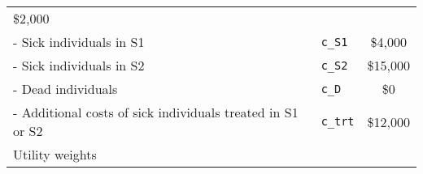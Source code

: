 \documentclass[
]{article}
\begin{document}
\begin{longtable}[]{@{}llc@{}}
\begin{minipage}[t]{0.21\columnwidth}
\$2,000\strut
\end{minipage}\tabularnewline
\begin{minipage}[t]{0.51\columnwidth}\raggedright
- Sick individuals in S1\strut
\end{minipage} & \begin{minipage}[t]{0.19\columnwidth}\raggedright
\texttt{c\_S1}\strut
\end{minipage} & \begin{minipage}[t]{0.21\columnwidth}\centering
\$4,000\strut
\end{minipage}\tabularnewline
\begin{minipage}[t]{0.51\columnwidth}\raggedright
- Sick individuals in S2\strut
\end{minipage} & \begin{minipage}[t]{0.19\columnwidth}\raggedright
\texttt{c\_S2}\strut
\end{minipage} & \begin{minipage}[t]{0.21\columnwidth}\centering
\$15,000\strut
\end{minipage}\tabularnewline
\begin{minipage}[t]{0.51\columnwidth}\raggedright
- Dead individuals\strut
\end{minipage} & \begin{minipage}[t]{0.19\columnwidth}\raggedright
\texttt{c\_D}\strut
\end{minipage} & \begin{minipage}[t]{0.21\columnwidth}\centering
\$0\strut
\end{minipage}\tabularnewline
\begin{minipage}[t]{0.51\columnwidth}\raggedright
- Additional costs of sick individuals treated in S1 or S2\strut
\end{minipage} & \begin{minipage}[t]{0.19\columnwidth}\raggedright
\texttt{c\_trt}\strut
\end{minipage} & \begin{minipage}[t]{0.21\columnwidth}\centering
\$12,000\strut
\end{minipage}\tabularnewline
\begin{minipage}[t]{0.51\columnwidth}\raggedright
Utility weights\strut
\end{minipage} & \begin{minipage}[t]{0.19\columnwidth}\raggedright
\strut
\end{minipage} & \begin{minipage}[t]{0.21\columnwidth}\centering
\strut

\end{minipage}
\end{longtable}
\end{document}
